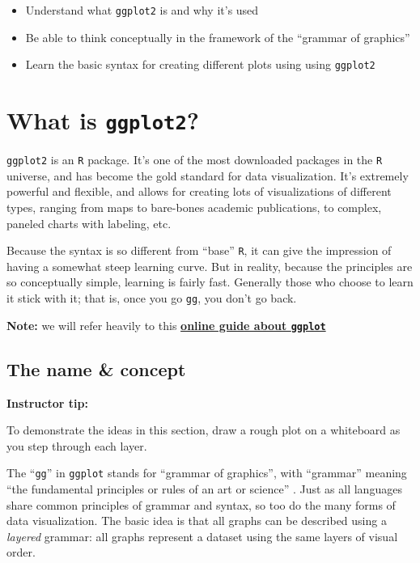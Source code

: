 \documentclass[
]{book}
\providecommand{\tightlist}{%
  \setlength{\itemsep}{0pt}\setlength{\parskip}{0pt}}
\begin{document}
\begin{itemize}
\tightlist
\item
  Understand what \texttt{ggplot2} is and why it's used
\item
  Be able to think conceptually in the framework of the ``grammar of graphics''
\item
  Learn the basic syntax for creating different plots using using \texttt{ggplot2}
\end{itemize}

\hypertarget{what-is-ggplot2}{%
\section*{\texorpdfstring{What is \texttt{ggplot2}?}{What is ggplot2?}}\label{what-is-ggplot2}}

\texttt{ggplot2} is an \texttt{R} package. It's one of the most downloaded packages in the \texttt{R} universe, and has become the gold standard for data visualization. It's extremely powerful and flexible, and allows for creating lots of visualizations of different types, ranging from maps to bare-bones academic publications, to complex, paneled charts with labeling, etc.

Because the syntax is so different from ``base'' \texttt{R}, it can give the impression of having a somewhat steep learning curve. But in reality, because the principles are so conceptually simple, learning is fairly fast. Generally those who choose to learn it stick with it; that is, once you go \texttt{gg}, you don't go back.

\textbf{Note:} we will refer heavily to this \href{https://ggplot2-book.org/introduction.html}{\textbf{online guide about \texttt{ggplot}}}

\hypertarget{the-name-concept}{%
\subsection*{The name \& concept}\label{the-name-concept}}

\leavevmode\hypertarget{tip-text}{}%
\textbf{Instructor tip:}

To demonstrate the ideas in this section, draw a rough plot on a whiteboard as you step through each layer.

The ``\texttt{gg}'' in \texttt{ggplot} stands for ``grammar of graphics'', with ``grammar'' meaning ``the fundamental principles or rules of an art or science'' \citep{layered-grammar}. Just as all languages share common principles of grammar and syntax, so too do the many forms of data visualization. The basic idea is that all graphs can be described using a \emph{layered} grammar: all graphs represent a dataset using the same layers of visual order.
\end{document}
